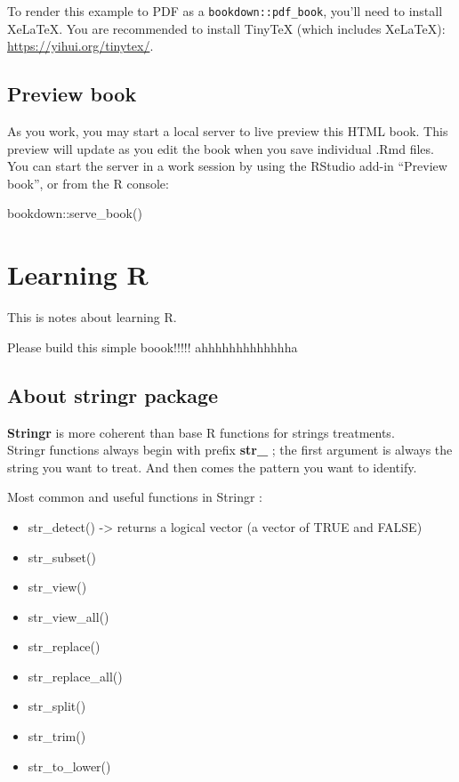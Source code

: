 \documentclass[
]{book}
\newenvironment{Shaded}{\begin{snugshade}}{\end{snugshade}}
\newcommand{\FunctionTok}[1]{\textcolor[rgb]{0.00,0.00,0.00}{#1}}
\newcommand{\NormalTok}[1]{#1}
\newcommand{\SpecialCharTok}[1]{\textcolor[rgb]{0.00,0.00,0.00}{#1}}
\providecommand{\tightlist}{%
  \setlength{\itemsep}{0pt}\setlength{\parskip}{0pt}}
\begin{document}
To render this example to PDF as a \texttt{bookdown::pdf\_book}, you'll need to install XeLaTeX. You are recommended to install TinyTeX (which includes XeLaTeX): \url{https://yihui.org/tinytex/}.

\hypertarget{preview-book}{%
\section{Preview book}\label{preview-book}}

As you work, you may start a local server to live preview this HTML book. This preview will update as you edit the book when you save individual .Rmd files. You can start the server in a work session by using the RStudio add-in ``Preview book'', or from the R console:

\begin{Shaded}
\begin{Highlighting}[]
\NormalTok{bookdown}\SpecialCharTok{::}\FunctionTok{serve\_book}\NormalTok{()}
\end{Highlighting}
\end{Shaded}

\hypertarget{learning-r}{%
\chapter{Learning R}\label{learning-r}}

This is notes about learning R.

Please build this simple boook!!!!! ahhhhhhhhhhhhha

\hypertarget{about-stringr-package}{%
\section{About stringr package}\label{about-stringr-package}}

\textbf{Stringr} is more coherent than base R functions for strings treatments.\\
Stringr functions always begin with prefix \textbf{str\_} ; the first argument is always the string you want to treat. And then comes the pattern you want to identify.

Most common and useful functions in Stringr :

\begin{itemize}
\tightlist
\item
  str\_detect() -\textgreater{} returns a logical vector (a vector of TRUE and FALSE)
\item
  str\_subset()
\item
  str\_view()
\item
  str\_view\_all()
\item
  str\_replace()
\item
  str\_replace\_all()
\item
  str\_split()
\item
  str\_trim()
\item
  str\_to\_lower()
\end{itemize}
\end{document}
